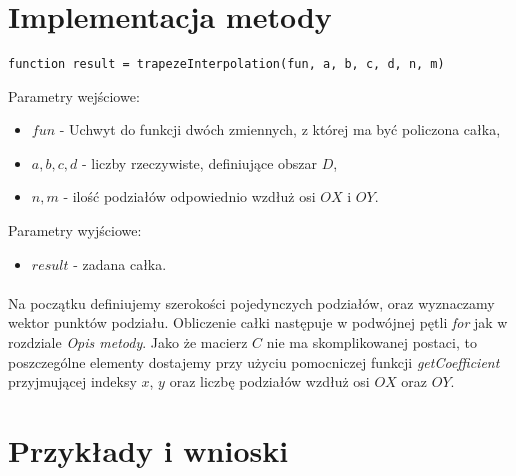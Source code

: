 \documentclass{article}
\begin{document}
\section{Implementacja metody}
\paragraph{}
\begin{lstlisting}[style=Matlab-editor]
function result = trapezeInterpolation(fun, a, b, c, d, n, m)
\end{lstlisting}
\vspace{4pt}
Parametry wejściowe:
\begin{itemize}
\item $fun$ - Uchwyt do funkcji dwóch zmiennych, z której ma być policzona całka,
\item $a,b,c,d$ - liczby rzeczywiste, definiujące obszar $D$,
\item $n,m$ - ilość podziałów odpowiednio wzdłuż osi $OX$ i $OY$.
\end{itemize}
Parametry wyjściowe:
\begin{itemize}
\item $result$ - zadana całka.
\end{itemize}
\paragraph{}
Na początku definiujemy szerokości pojedynczych podziałów, oraz wyznaczamy wektor punktów podziału. Obliczenie całki następuje w podwójnej pętli \textit{for} jak w rozdziale \textit{Opis metody}. Jako że macierz $C$ nie ma skomplikowanej postaci, to poszczególne elementy dostajemy przy użyciu pomocniczej funkcji \textit{getCoefficient} przyjmującej indeksy $x$, $y$ oraz liczbę podziałów wzdłuż osi $OX$ oraz $OY$.
\section{Przykłady i wnioski}
\end{document}
